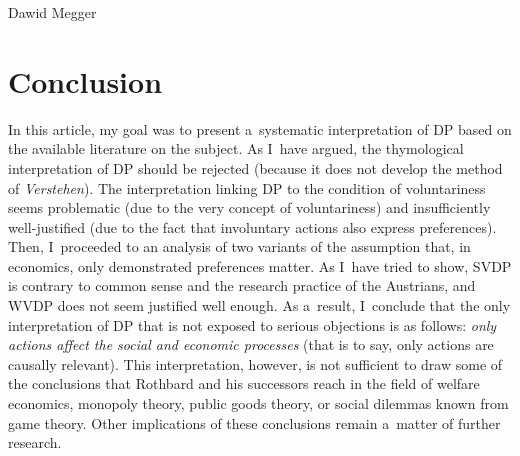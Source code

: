 \begin{artengenv}{Dawid Megger}
\section{Conclusion}

In this article, my goal was to present a~systematic interpretation of DP based on the available literature on the subject. As I~have argued, the thymological interpretation of DP should be rejected (because it does not develop the method of \textit{Verstehen}). The interpretation linking DP to the condition of voluntariness seems problematic (due to the very concept of voluntariness) and insufficiently well-justified (due to the fact that involuntary actions also express preferences). Then, I~proceeded to an analysis of two variants of the assumption that, in economics, only demonstrated preferences matter. As I~have tried to show, SVDP is contrary to common sense and the research practice of the Austrians, and WVDP does not seem justified well enough. As a~result, I~conclude that the only interpretation of DP that is not exposed to serious objections is as follows: \textit{only actions affect the social and economic processes} (that is to say, only actions are causally relevant). This interpretation, however, is not sufficient to draw some of the conclusions that Rothbard and his successors reach in the field of welfare economics, monopoly theory, public goods theory, or social dilemmas known from game theory. Other implications of these conclusions remain a~matter of further research.



\end{artengenv}

\label{megger-last}